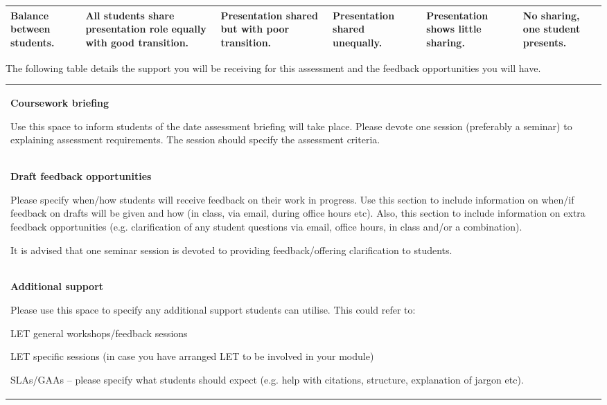 \documentclass{MDXHandbook}
\begin{document}
\begin{landscape}
\begin{tabular}{|p{.145\linewidth}|p{.145\linewidth}|p{.145\linewidth}|p{.145\linewidth}|p{.145\linewidth}|p{.145\linewidth}|}
		Balance between students.
		& All students share presentation role equally with good transition.
		& Presentation shared but with poor transition.
		& Presentation shared unequally.
		& Presentation shows little sharing.
		& No sharing, one student presents.
		\\\hline
	\end{tabular}


\newpage
The following table details the support you will be receiving for this assessment and the feedback opportunities you will have. 

\begin{tabular}{|p{.9\linewidth}|}
	\rowcolor{MDXCorporateRed}\hline
	\multicolumn{1}{|p{.9\linewidth}|}{\centering
	\textcolor{white}{\textbf{Support and draft feedback sessions for Insert assessment}}} \\\hline
	\textbf{Coursework briefing}

	Use this space to inform students of the date assessment briefing will take place. Please devote one session (preferably a seminar) to explaining assessment requirements. The session should specify the assessment criteria.
	\\\hline
	\textbf{Draft feedback opportunities}

	Please specify when/how students will receive feedback on their work in progress. Use this section to include information on when/if feedback on drafts will be given and how (in class, via email, during office hours etc). Also, this section to include information on extra feedback opportunities (e.g. clarification of any student questions via email, office hours, in class and/or a combination).

	It is advised that one seminar session is devoted to providing feedback/offering clarification to students. 
	\\\hline
	\textbf{Additional support}

	Please use this space to specify any additional support students can utilise. This could refer to:

	LET general workshops/feedback sessions
	
	LET specific sessions (in case you have arranged LET to be involved in your module)
	
	SLAs/GAAs – please specify what students should expect (e.g. help with citations, structure, explanation of jargon etc).
	\\\hline
\end{tabular}

\end{landscape}
\end{document}

